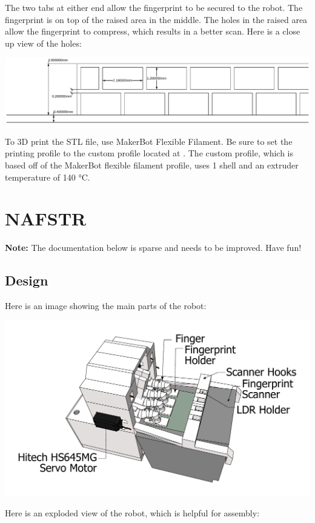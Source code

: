 \documentclass[letterpaper,10pt,english]{sphinxmanual}
\begin{document}
The two tabs at either end allow the fingerprint to be secured to the robot. The fingerprint is on top of the raised area in the middle. The holes in the raised area allow the fingerprint to compress, which results in a better scan. Here is a close up view of the holes:

\includegraphics{LabeledFingerprintZoomed.pdf}

To 3D print the STL file, use MakerBot Flexible Filament. Be sure to set the printing profile to the custom profile located at . The custom profile, which is based off of the MakerBot flexible filament profile, uses 1 shell and an extruder temperature of 140 °C.


\chapter{NAFSTR}
\label{NAFSTR::doc}\label{NAFSTR:nafstr}
\textbf{Note:} The documentation below is sparse and needs to be improved. Have fun!


\section{Design}
\label{NAFSTR:design}
Here is an image showing the main parts of the robot:

\includegraphics{Scene1N.pdf}

Here is an exploded view of the robot, which is helpful for assembly:
\end{document}
